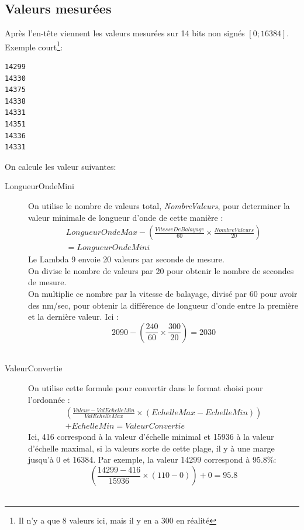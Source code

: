 \documentclass[a4paper, 12pt]{article}
\begin{document}
\subsection{Valeurs mesurées}\label{valeurs}

Après l'en-tête viennent les valeurs mesurées sur 14 bits non signés $[0;16384]$. 
Exemple court\footnote{Il n'y a que 8 valeurs ici, mais il y en a 300 en réalité}:  

\begin{lstlisting}
14299
14330
14375
14338
14331
14351
14336
14331
\end{lstlisting}

On calcule les valeur suivantes: 

\begin{description}
	\item[LongueurOndeMini] On utilise le nombre de valeurs total, \emph{NombreValeurs}, pour determiner la valeur minimale de longueur d'onde de cette manière :
		\begin{multline*}
			 LongueurOndeMax - \left ( \frac{VitesseDeBalayage}{60} \times \frac{NombreValeurs}{20} \right ) 
			\\ = LongueurOndeMini 
\end{multline*}
		Le Lambda 9 envoie 20 valeurs par seconde de mesure.\\
		On divise le nombre de valeurs par 20 pour obtenir le nombre de secondes de mesure.\\
		On multiplie ce nombre par la vitesse de balayage, divisé par 60 pour avoir des nm/sec, pour obtenir la différence de longueur d'onde entre la première et la dernière valeur.
		Ici :
		$$ 2090 - \left ( \frac{240}{60} \times \frac{300}{20} \right ) = 2030 $$ \\


	\item[ValeurConvertie] On utilise cette formule pour convertir dans le format choisi pour l'ordonnée :
		\begin{multline*}
		 \left ( \frac{Valeur - ValEchelleMin}{ValEchelleMax} \times (EchelleMax - EchelleMin) \right ) 
			\\ + EchelleMin = ValeurConvertie 
			\end{multline*}
		Ici, 416 correspond à la valeur d'échelle minimal et 15936 à la valeur d'échelle maximal, si la valeurs sorte de cette plage, il y à une marge jusqu'à 0 et 16384.
		Par exemple, la valeur 14299 correspond à 95.8\%: 
		$$ \left (\frac{14299-416}{15936} \times ( 110 - 0 ) \right ) + 0 = 95.8$$\\

\end{description}
\end{document}
